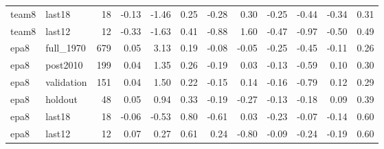 \begin{table}
\begin{tabular}{llrrrrrrrrrr}
team8 & last18 & 18 & -0.13 & -1.46 & 0.25 & -0.28 & 0.30 & -0.25 & -0.44 & -0.34 & 0.31 \\
team8 & last12 & 12 & -0.33 & -1.63 & 0.41 & -0.88 & 1.60 & -0.47 & -0.97 & -0.50 & 0.49 \\
epa8 & full\_1970 & 679 & 0.05 & 3.13 & 0.19 & -0.08 & -0.05 & -0.25 & -0.45 & -0.11 & 0.26 \\
epa8 & post2010 & 199 & 0.04 & 1.35 & 0.26 & -0.19 & 0.03 & -0.13 & -0.59 & 0.10 & 0.30 \\
epa8 & validation & 151 & 0.04 & 1.50 & 0.22 & -0.15 & 0.14 & -0.16 & -0.79 & 0.12 & 0.29 \\
epa8 & holdout & 48 & 0.05 & 0.94 & 0.33 & -0.19 & -0.27 & -0.13 & -0.18 & 0.09 & 0.39 \\
epa8 & last18 & 18 & -0.06 & -0.53 & 0.80 & -0.61 & 0.03 & -0.23 & -0.07 & -0.14 & 0.60 \\
epa8 & last12 & 12 & 0.07 & 0.27 & 0.61 & 0.24 & -0.80 & -0.09 & -0.24 & -0.19 & 0.60 \\
\bottomrule
\end{tabular}
\end{table}
